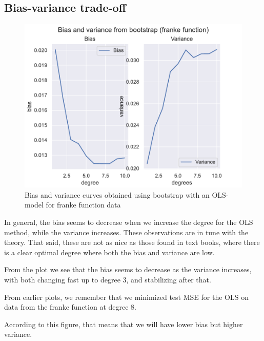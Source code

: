\documentclass[12pt]{article}
\begin{document}

\subsection{Bias-variance trade-off}

\begin{figure}[H]
    \centering
    \includegraphics[width=0.8\columnwidth]{../src/output/bootstrap_bias_variance_franke_function.pdf}
    \caption{Bias and variance curves obtained using bootstrap with an OLS-model for franke function data}
    \label{fig:franke_bias_variance_bootstrap}
\end{figure}

In general, the bias seems to decrease when we increase the degree for the OLS method, while the variance increases.
These observations are in tune with the theory.
That said, these are not as nice as those found in text books, where there is a clear optimal degree where both the bias and variance are low.

From the plot we see that the bias seems to decrease as the variance increases, with both changing fast up to degree 3, and stabilizing after that.

From earlier plots, we remember that we minimized test MSE for the OLS on data from the franke function at degree 8.

According to this figure, that means that we will have lower bias but higher variance.
\end{document}
